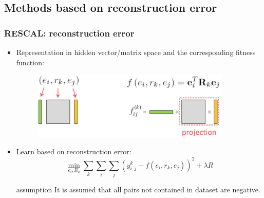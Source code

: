 \documentclass[pdf,10pt]{beamer}
\begin{document}
\subsection{Methods based on reconstruction error}
\begin{frame}
\frametitle{RESCAL: reconstruction error}
\begin{itemize}
	\item Representation in hidden vector/matrix space and the corresponding fitness function:
		\begin{figure}
			\includegraphics[width=0.90\textwidth,height=0.30\textwidth]{5.eps}
		\end{figure}
	\item Learn based on reconstruction error:
		\begin{equation}
			\min_{e_i,R_k}\sum_k\sum_i\sum_j{(y_{i,j}^k-f(e_i,r_k,e_j))^2+\lambda R}
		\end{equation}
	\begin{exampleblock}{assumption}
		It is assumed that all pairs not contained in dataset are negative.
	\end{exampleblock}
\end{itemize}
\end{frame}
\end{document}
